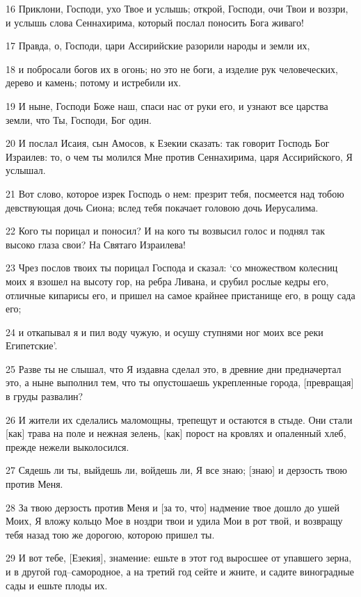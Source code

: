 \par 16 Приклони, Господи, ухо Твое и услышь; открой, Господи, очи Твои и воззри, и услышь слова Сеннахирима, который послал поносить Бога живаго!
\par 17 Правда, о, Господи, цари Ассирийские разорили народы и земли их,
\par 18 и побросали богов их в огонь; но это не боги, а изделие рук человеческих, дерево и камень; потому и истребили их.
\par 19 И ныне, Господи Боже наш, спаси нас от руки его, и узнают все царства земли, что Ты, Господи, Бог один.
\par 20 И послал Исаия, сын Амосов, к Езекии сказать: так говорит Господь Бог Израилев: то, о чем ты молился Мне против Сеннахирима, царя Ассирийского, Я услышал.
\par 21 Вот слово, которое изрек Господь о нем: презрит тебя, посмеется над тобою девствующая дочь Сиона; вслед тебя покачает головою дочь Иерусалима.
\par 22 Кого ты порицал и поносил? И на кого ты возвысил голос и поднял так высоко глаза свои? На Святаго Израилева!
\par 23 Чрез послов твоих ты порицал Господа и сказал: `со множеством колесниц моих я взошел на высоту гор, на ребра Ливана, и срубил рослые кедры его, отличные кипарисы его, и пришел на самое крайнее пристанище его, в рощу сада его;
\par 24 и откапывал я и пил воду чужую, и осушу ступнями ног моих все реки Египетские'.
\par 25 Разве ты не слышал, что Я издавна сделал это, в древние дни предначертал это, а ныне выполнил тем, что ты опустошаешь укрепленные города, [превращая] в груды развалин?
\par 26 И жители их сделались маломощны, трепещут и остаются в стыде. Они стали [как] трава на поле и нежная зелень, [как] порост на кровлях и опаленный хлеб, прежде нежели выколосился.
\par 27 Сядешь ли ты, выйдешь ли, войдешь ли, Я все знаю; [знаю] и дерзость твою против Меня.
\par 28 За твою дерзость против Меня и [за то, что] надмение твое дошло до ушей Моих, Я вложу кольцо Мое в ноздри твои и удила Мои в рот твой, и возвращу тебя назад тою же дорогою, которою пришел ты.
\par 29 И вот тебе, [Езекия], знамение: ешьте в этот год выросшее от упавшего зерна, и в другой год--самородное, а на третий год сейте и жните, и садите виноградные сады и ешьте плоды их.
